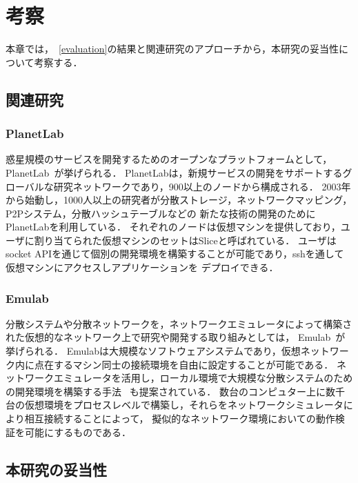 \chapter{考察}
\label{consideration}

本章では，~\ref{evaluation}の結果と関連研究のアプローチから，本研究の妥当性について考察する．

\section{関連研究}
\label{consideration:related-works}

\subsection{PlanetLab}
\label{consideration:related-works:planetlab}

惑星規模のサービスを開発するためのオープンなプラットフォームとして，PlanetLab~\cite{PlanetLab}が挙げられる．
PlanetLabは，新規サービスの開発をサポートするグローバルな研究ネットワークであり，900以上のノードから構成される．
2003年から始動し，1000人以上の研究者が分散ストレージ，ネットワークマッピング，P2Pシステム，分散ハッシュテーブルなどの
新たな技術の開発のためにPlanetLabを利用している．
それぞれのノードは仮想マシンを提供しており，ユーザに割り当てられた仮想マシンのセットはSliceと呼ばれている．
ユーザはsocket APIを通じて個別の開発環境を構築することが可能であり，sshを通して仮想マシンにアクセスしアプリケーションを
デプロイできる．

\subsection{Emulab}
\label{consideration:related-works:emulab}

分散システムや分散ネットワークを，ネットワークエミュレータによって構築された仮想的なネットワーク上で研究や開発する取り組みとしては，
Emulab~\cite{Emulab}が挙げられる．
Emulabは大規模なソフトウェアシステムであり，仮想ネットワーク内に点在するマシン同士の接続環境を自由に設定することが可能である．
ネットワークエミュレータを活用し，ローカル環境で大規模な分散システムのための開発環境を構築する手法
~\cite{RelatedWork1}も提案されている．
数台のコンピュター上に数千台の仮想環境をプロセスレベルで構築し，それらをネットワークシミュレータにより相互接続することによって，
擬似的なネットワーク環境においての動作検証を可能にするものである．

\section{本研究の妥当性}

